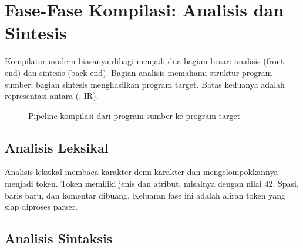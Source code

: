 \section{Fase-Fase Kompilasi: Analisis dan Sintesis}
\label{sec:ch03-fase}

Kompilator modern biasanya dibagi menjadi dua bagian besar: analisis
(front-end) dan sintesis (back-end). Bagian analisis memahami struktur
program sumber; bagian sintesis menghasilkan program target. Batas
keduanya adalah representasi antara (, IR).

\begin{figure}[H]
\centering
{}
\caption{Pipeline kompilasi dari program sumber ke program target}
\label{fig:ch03-pipeline}
\end{figure}

\subsection{Analisis Leksikal}

Analisis leksikal membaca karakter demi karakter dan mengelompokkannya
menjadi token. Token memiliki jenis dan atribut, misalnya
 dengan nilai 42. Spasi, baris baru, dan komentar
dibuang. Keluaran fase ini adalah aliran token yang siap diproses
parser.

\subsection{Analisis Sintaksis}

